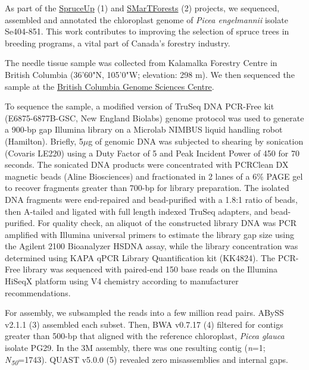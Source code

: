 \documentclass[titlepage,11pt, oneside]{article}   	%
\begin{document}
As part of the \href{http://spruce-up.ca/en/}{SpruceUp} (1) and \href{https://www.smartforests.ca}{SMarTForests} (2) projects, we sequenced, assembled and annotated the chloroplast genome of \textit{Picea engelmannii} isolate Se404-851. This work contributes to improving the selection of spruce trees in breeding programs, a vital part of Canada’s forestry industry.
\newline
\par
The needle tissue sample was collected from Kalamalka Forestry Centre in British Columbia (36'60"N, 105'0"W; elevation: 298 m). We then sequenced the sample at the \href{http://www.bcgsc.ca}{British Columbia Genome Sciences Centre}.
\newline
\par
To sequence the sample, a modified version of TruSeq DNA PCR-Free kit (E6875-6877B-GSC, New England Biolabs) genome protocol was used to generate a 900-bp gap Illumina library on a Microlab NIMBUS liquid handling robot (Hamilton). Briefly, 5$\mu$g of genomic DNA was subjected to shearing by sonication (Covaris LE220) using a Duty Factor of 5 and Peak Incident Power of 450 for 70 seconds. The sonicated DNA products were concentrated with PCRClean DX magnetic beads (Aline Biosciences) and fractionated in 2 lanes of a 6\% PAGE gel to recover fragments greater than 700-bp for library preparation.  The isolated DNA fragments were end-repaired and bead-purified with a 1.8:1 ratio of beads, then A-tailed and ligated with full length indexed TruSeq adapters, and bead-purified. For quality check, an aliquot of the constructed library DNA was PCR amplified with Illumina universal primers to estimate the library gap size using the Agilent 2100 Bioanalyzer HSDNA assay, while the library concentration was determined using KAPA qPCR Library Quantification kit (KK4824). The PCR-Free library was sequenced with paired-end 150 base reads on the Illumina HiSeqX platform using V4 chemistry according to manufacturer recommendations.
\newline
\par
For assembly, we subsampled the reads into a few million read pairs. ABySS v2.1.1 (3) assembled each subset. Then, BWA v0.7.17 (4) filtered for contigs greater than 500-bp that aligned with the reference chloroplast, \textit{Picea glauca} isolate PG29. In the 3M assembly, there was one resulting contig (\textit{n}=1; \textit{N\textsubscript{50}}=1743). QUAST v5.0.0 (5) revealed zero misassemblies and internal gaps.
\newline
\end{document}
